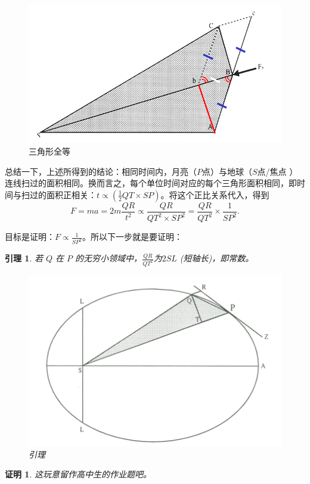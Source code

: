 \documentclass[a4paper]{article}
\newtheorem{lem}{引理}
\newtheorem{prof}{证明}
\begin{document}
\begin{figure}[htp]
    \centering
    \includegraphics[scale=0.5]{samearea.png}
    \caption{三角形全等}
    \label{samearea}
\end{figure}

总结一下，上述所得到的结论：相同时间内，月亮（$P$点）与地球（$S$点/焦点 ）连线扫过的面积相同。换而言之，每个单位时间对应的每个三角形面积相同，即时间与扫过的面积正相关：$t\propto (\frac{1}{2}QT\times SP)$。将这个正比关系代入，得到
\begin{equation*}
    F=ma=2m\frac{QR}{t^{2}}\propto\frac{QR}{QT^{2}\times SP^{2}}=\frac{QR}{QT^{2}}\times \frac{1}{SP^{2}}.
\end{equation*}

目标是证明：$F\propto \frac{1}{SP^{2}}$。所以下一步就是要证明：
\begin{lem}
若 $Q$ 在 $P$ 的无穷小领域中，$\frac{QR}{QT^{2}}$为$2SL$ (短轴长)，即常数。

\begin{figure}[htp]
    \centering
    \includegraphics[scale=0.5]{ellptic.png}
    \caption{引理}
    \label{ellptic}
\end{figure}
\end{lem}
\begin{prof}
这玩意留作高中生的作业题吧。
\end{prof}
\end{document}
